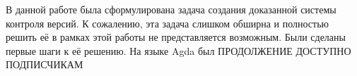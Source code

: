 \startconclusionpage

В данной работе была сформулирована задача создания доказанной системы
контроля версий. К сожалению, эта задача слишком обширна и полностью
решить её в рамках этой работы не представляется возможным. Были
сделаны первые шаги к её решению. На языке Agda был ПРОДОЛЖЕНИЕ
ДОСТУПНО ПОДПИСЧИКАМ
